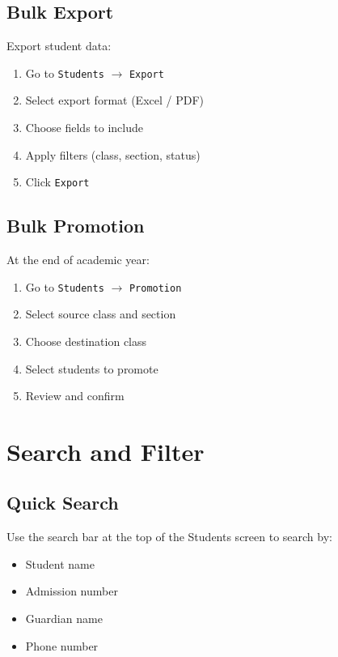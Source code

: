 \documentclass[12pt,a4paper]{report}
\begin{document}
\section{Bulk Export}

Export student data:

\begin{enumerate}[leftmargin=*]
    \item Go to \texttt{Students} $\rightarrow$ \texttt{Export}
    \item Select export format (Excel / PDF)
    \item Choose fields to include
    \item Apply filters (class, section, status)
    \item Click \texttt{Export}
\end{enumerate}

\section{Bulk Promotion}

At the end of academic year:

\begin{enumerate}[leftmargin=*]
    \item Go to \texttt{Students} $\rightarrow$ \texttt{Promotion}
    \item Select source class and section
    \item Choose destination class
    \item Select students to promote
    \item Review and confirm
\end{enumerate}

\chapter{Search and Filter}

\section{Quick Search}

Use the search bar at the top of the Students screen to search by:
\begin{itemize}[leftmargin=*]
    \item Student name
    \item Admission number
    \item Guardian name
    \item Phone number
\end{itemize}
\end{document}
